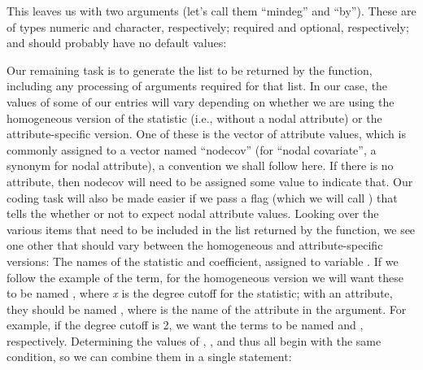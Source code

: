 \documentclass[nojss]{jss}
\begin{document}
This leaves us with two arguments (let's call them ``mindeg'' and ``by''). These
are of types numeric and character, respectively; required and optional,
respectively; and should probably have no default values:
 \begin{CodeChunk}
\begin{CodeInput}
InitErgmTerm.mindegree <- function(nw, arglist, ...) {
  a <- check.ErgmTerm(nw, arglist, directed=FALSE, bipartite=FALSE,
          varnames = c("mindeg", "by"),
          vartypes = c("numeric", "character"),
          required = c(TRUE, FALSE),
          defaultvalues = list(NULL, NULL))
\end{CodeInput}
\end{CodeChunk}

Our remaining task is to generate the list to be returned by the function,
including any processing of arguments required for that list. In our case, the
values of some of our entries will vary depending on whether we are using the
homogeneous version of the statistic (i.e., without a nodal attribute) or the
attribute-specific version. One of these is the vector of attribute values,
which is commonly assigned to a vector named ``nodecov'' (for ``nodal
covariate'', a synonym for nodal attribute), a convention we shall follow here.
If there is no attribute, then nodecov will need to be assigned some value to
indicate that. Our  coding task will also be made easier if we pass
a flag (which we will call ) that tells the  whether
or not to expect nodal attribute values. Looking over the various items that
need to be included in the list returned by the function, we see one other that
should vary between the homogeneous and attribute-specific versions: The names
of the statistic and coefficient, assigned to variable . If we
follow the example of the  term, for the homogeneous version we
will want these to be named , where {\it x} is the degree
cutoff for the statistic; with an attribute, they should be named
, where  is the name of the
attribute in the  argument. For example, if the degree cutoff is 2, we
want the terms to be named  and ,
respectively. Determining the values of , , and
 thus all begin with the same condition, so we can combine them
in a single  statement:
\begin{CodeChunk}
\end{CodeChunk}
\end{document}
